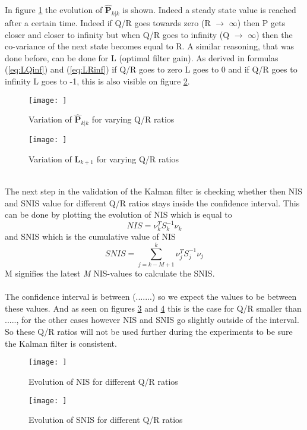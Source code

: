 In figure \ref{fig:PkkvarQR} the evolution of $\hat{\textbf{P}}_{k|k}$ is shown. Indeed a steady state value is reached after a certain time. Indeed if Q/R goes towards zero (R $\rightarrow$ $\infty$) then P gets closer and closer to infinity but when Q/R goes to infinity (Q $\rightarrow$ $\infty$) then the co-variance of the next state becomes equal to R. A similar reasoning, that was done before, can be done for L (optimal filter gain). As derived in formulas (\ref{eq:LQinf}) and (\ref{eq:LRinf}) if Q/R goes to zero L goes to 0 and if Q/R goes to infinity L goes to -1, this is also visible on figure \ref{fig:Lk+1varQR}.
\begin{figure}
    \centering
    \texttt{[image: ]}
    \caption{Variation of $\hat{\textbf{P}}_{k|k}$ for varying Q/R ratios}
    \label{fig:PkkvarQR}
\end{figure}
\begin{figure}
    \centering
    \texttt{[image: ]}
    \caption{Variation of $\textbf{L}_{k+1}$ for varying Q/R ratios}
    \label{fig:Lk+1varQR}
\end{figure}
\\
The next step in the validation of the Kalman filter is checking whether then NIS and SNIS value for different Q/R ratios stays inside the confidence interval. This can be done by plotting the evolution of NIS which is equal to
\begin{equation}
    NIS = \nu_{k}^{T} S_{k}^{-1} \nu_{k}
\end{equation}
and SNIS which is the cumulative value of NIS
\begin{equation}
    SNIS = \sum_{j=k-M+1}^{k} \nu_{j}^{T} S_{j}^{-1} \nu_{j}
\end{equation}
M signifies the latest \textit{M} NIS-values to calculate the SNIS.\\
\\
The confidence interval is between (.......) so we expect the values to be between these values. And as seen on figures \ref{fig:NIS} and \ref{fig:SNIS} this is the case for Q/R smaller than ....., for the other cases however NIS and SNIS go slightly outside of the interval. So these Q/R ratios will not be used further during the experiments to be sure the Kalman filter is consistent.
\begin{figure}
    \centering
    \texttt{[image: ]}
    \caption{Evolution of NIS for different Q/R ratios}
    \label{fig:NIS}
\end{figure}
\begin{figure}
    \centering
    \texttt{[image: ]}
    \caption{Evolution of SNIS for different Q/R ratios}
    \label{fig:SNIS}
\end{figure}
